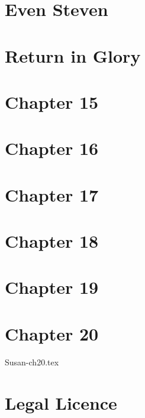 \documentclass[12pt,twoside,onecolumn,openright,extrafontsizes]{memoir}
\begin{document}
\chapter{Even Steven}

\chapter{Return in Glory}

\chapter{Chapter 15}
\lipsum[81-100]
\chapter{Chapter 16}
\lipsum[101-120]
\chapter{Chapter 17}
\lipsum[121-140]
\chapter{Chapter 18}
\lipsum[141-160]
\chapter{Chapter 19}
\lipsum[61-80]
\chapter{Chapter 20}
 {Susan-ch20.tex}




\chapter{Legal Licence}


\end{document}
